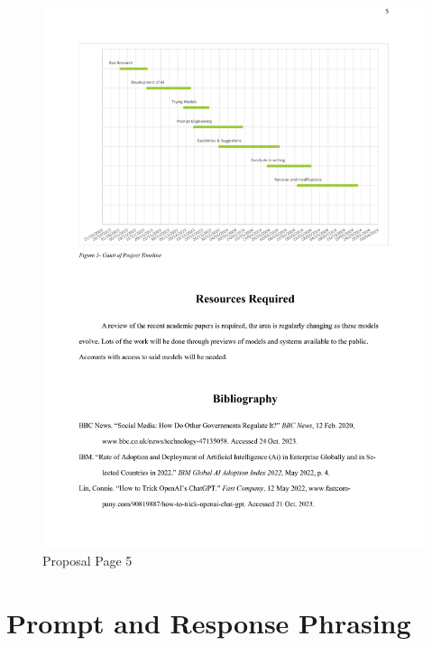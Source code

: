 \documentclass[12pt]{article}
\begin{document}
\begin{figure}[H]
    \centering
    \includegraphics[width=0.85\linewidth]{Images/0005.jpg}
    \caption{Proposal Page 5}
    
\end{figure}

\section{Prompt and Response Phrasing}

\label{appendix:prompt-phrasing}
\end{document}
